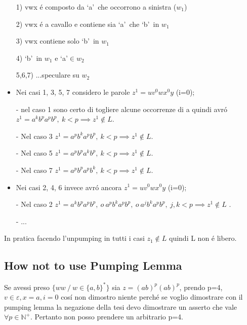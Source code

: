 \begin{itemize}
\item[1)] vwx \'e composto da \lq a\rq\ che occorrono a sinistra ($w_1$)\\
\item[2)] vwx \'e a cavallo e contiene sia \lq a\rq\ che \lq b\rq\ in $w_1$\\
\item[3)] vwx contiene solo \lq b\rq\ in $w_1$\\
\item[4)] \lq b\rq\ in $w_1$ e \lq a\rq $\in w_2$\\
\item[5,6,7)] ...speculare su $w_2$\\
\end{itemize} 
\begin{itemize}
	\item Nei casi 1, 3, 5, 7 considero le parole $z^1=uv^0wx^0y$ (i=0);\\
	\item[-] nel caso 1 sono certo di togliere alcune occorrenze di a quindi avr\'o $z^1 = a^k b^p a^p b^p,\ k < p \implies z^1 \not\in L$. \\
	\item[-] Nel caso 3 $z^1 = a^p b^k a^p b^p,\ k < p \implies z^1 \not\in L$.\\
	\item[-] Nel caso 5 $z^1 = a^p b^p a^k b^p,\ k < p \implies z^1 \not\in L$.\\
	\item[-] Nel caso 7 $z^1 = a^p b^p a^p b^k,\ k < p \implies z^1 \not\in L$.\\
	\item Nei casi 2, 4, 6 invece avr\'o ancora $ z^1=uv^0wx^0y $ (i=0);\\
	\item[-] Nel caso 2 $z^1 = a^k b^p a^p b^p,\ o\ a^p b^k a^p b^p,\ o\ a^j b^k a^p b^p,\ j,k < p \implies z^1 \not\in L$ .\\
	\item[-] ...\\
\end{itemize}
In pratica facendo l'unpumping in tutti i casi $z_1 \not\in L$ quindi L non \'e libero.

\subsection{How not to use Pumping Lemma}
Se avessi preso $\{ww \ / \ w\in\{a,b\}^*\}$ sia $z = (ab)^p (ab)^p$, prendo p=4, $v\in\varepsilon, x=a, i = 0$ cos\'i non 
dimostro niente perch\'e se voglio dimostrare con il pumping lemma la negazione della tesi devo dimostrare un asserto che vale $\forall p \in \mathbb{N}^+$.
Pertanto non posso prendere un arbitrario p=4.



